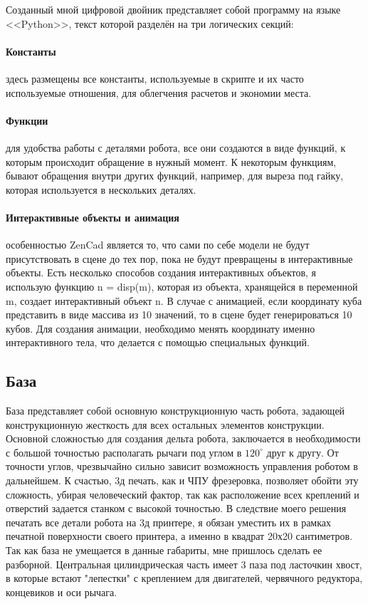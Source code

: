 Созданный мной цифровой двойник представляет собой программу на языке <<Python>>, текст которой разделён на три логических секций:

\paragraph{Константы} здесь размещены все константы, используемые в скрипте и их часто используемые отношения, для облегчения расчетов и экономии места.
\paragraph{Функции} для удобства работы с деталями робота, все они создаются в виде функций, к которым происходит обращение в нужный момент. К некоторым функциям, бывают обращения внутри других функций, например, для выреза под гайку, которая используется в нескольких деталях.  
\paragraph{Интерактивные объекты и анимация} особенностью ZenCad является то, что сами по себе модели не будут присутствовать в сцене до тех пор, пока не будут превращены в интерактивные объекты. Есть несколько способов создания интерактивных объектов, я использую функцию n = disp(m), которая из объекта, хранящейся в переменной m, создает интерактивный объект n. В случае с анимацией, если координату куба представить в виде массива из 10 значений, то в сцене будет генерироваться 10 кубов. Для создания анимации, необходимо менять координату именно интерактивного тела, что делается с помощью специальных функций. 


\subsection{База}

База представляет собой основную конструкционную часть робота, задающей конструкционную жесткость для всех остальных элементов конструкции. Основной сложностью для  создания дельта робота, заключается в необходимости с большой точностью располагать рычаги под углом в $120^{\circ}$ друг к другу. От точности углов, чрезвычайно сильно зависит возможность управления роботом в дальнейшем. К счастью, 3д печать, как и ЧПУ фрезеровка, позволяет обойти эту сложность, убирая человеческий фактор, так как расположение всех креплений и отверстий задается станком с высокой точностью. В следствие моего решения печатать все детали робота на 3д принтере, я обязан уместить их в рамках печатной поверхности своего принтера, а именно в квадрат 20х20 сантиметров. Так как база не умещается в данные габариты, мне пришлось сделать ее разборной. Центральная цилиндрическая часть имеет 3 паза под ласточкин хвост, в которые встают "лепестки" с креплением для двигателей, червячного редуктора, концевиков и оси рычага.

